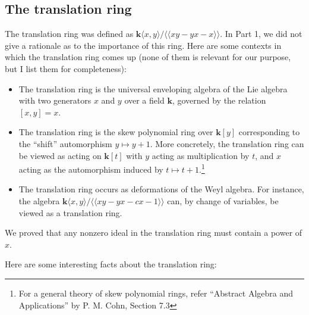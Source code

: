 \documentclass[a4paper]{amsart}
\newcommand{\field}{\mathbf{k}}
\begin{document}
\subsection{The translation ring}

The translation ring was defined as $\field \langle x,y \rangle/
\langle \langle xy - yx - x \rangle \rangle$. In Part 1, we did not
give a rationale as to the importance of this ring. Here are some
contexts in which the translation ring comes up (none of them is
relevant for our purpose, but I list them for completeness):

\begin{itemize}

\item The translation ring is the universal enveloping algebra of the
  Lie algebra with two generators $x$ and $y$ over a field $\field$,
  governed by the relation $[x,y] = x$.

\item The translation ring is the skew polynomial ring over
  $\field[y]$ corresponding to the ``shift'' automorphism $y \mapsto y
  + 1$. More concretely, the translation ring can be viewed as acting
  on $\field[t]$ with $y$ acting as multiplication by $t$, and $x$
  acting as the automorphism induced by $t \mapsto t +
  1$.\footnote{For a general theory of skew polynomial rings, refer
    ``Abstract Algebra and Applications'' by P. M. Cohn, Section 7.3}

\item The translation ring occurs as deformations of the Weyl
  algebra. For instance, the algebra $\field\langle x,y
  \rangle/\langle \langle xy - yx - cx - 1\rangle \rangle$ can, by
  change of variables, be viewed as a translation ring.

\end{itemize}

We proved that any nonzero ideal in the translation ring must contain
a power of $x$.

Here are some interesting facts about the translation ring:
\end{document}
